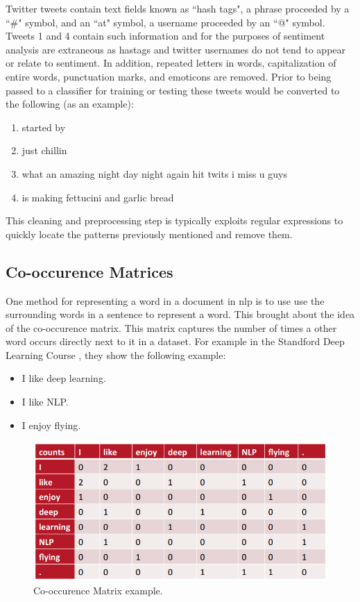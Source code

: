 \documentclass[12pt]{article}
\begin{document}
Twitter tweets contain text fields known as ``hash tags", a phrase proceeded by a ``\#" symbol, and an ``at" symbol, a username proceeded by an ``@" symbol. Tweets 1 and 4 contain such information and for the purposes of sentiment analysis are extraneous as hastags and twitter usernames do not tend to appear or relate to sentiment. In addition, repeated letters in words, capitalization of entire words, punctuation marks, and emoticons are removed. Prior to being passed to a classifier for training or testing these tweets would be converted to the following (as an example): 

\begin{enumerate}
	\item started by
	\item just chillin
	\item what an amazing night day night again hit twits i miss u guys
	\item is making fettucini and garlic bread
\end{enumerate} 

This cleaning and preprocessing step is typically exploits regular expressions to quickly locate the patterns previously mentioned and remove them.

\subsection{Co-occurence Matrices}

One method for representing a word in a document in \ac{nlp} is to use use the surrounding words in a sentence to represent a word. This brought about the idea of the co-occurence matrix. This matrix captures the number of times a other word occurs directly next to it in a dataset. For example in the Standford Deep Learning Course \cite{dl_course}, they show the following example:

\begin{itemize}
	\item I like deep learning.
	\item I like NLP.
	\item I enjoy flying.
\end{itemize}

\begin{figure}[htbp!]
	\centering
	\includegraphics[scale=.4]{cooccurence.png}
	\caption{Co-occurence Matrix example.}
	\label{fig:cooccurence}
\end{figure}
\end{document}
